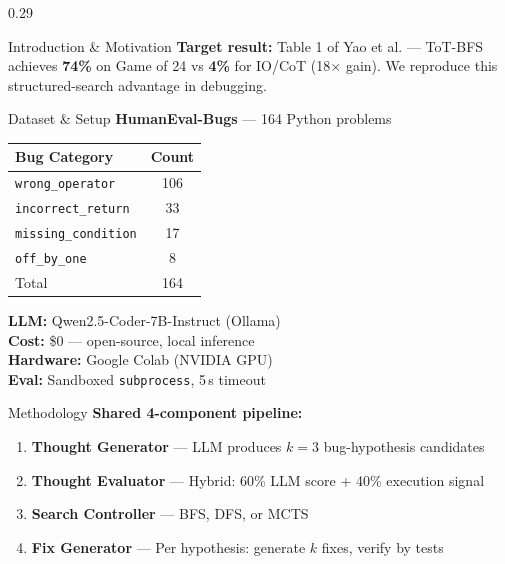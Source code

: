 \documentclass[final]{beamer}
\begin{document}
\begin{frame}[t]{}
\begin{columns}[t,totalwidth=\textwidth]
\begin{column}{0.29\textwidth}
\begin{block}{Introduction \& Motivation}
\vspace{0.4cm}
\textbf{Target result:} Table 1 of Yao et al. — ToT-BFS achieves \textbf{74\%} on Game of 24 vs \textbf{4\%} for IO/CoT (18$\times$ gain). We reproduce this structured-search advantage in debugging.
\end{block}

\vspace{0.5cm}

\begin{block}{Dataset \& Setup}
\textbf{HumanEval-Bugs} — 164 Python problems

\vspace{0.35cm}
\begin{tabular}{@{} l c @{}}
\toprule
\textbf{Bug Category} & \textbf{Count} \\
\midrule
\texttt{wrong\_operator}    & 106 \\
\texttt{incorrect\_return}  & 33  \\
\texttt{missing\_condition} & 17  \\
\texttt{off\_by\_one}       & 8   \\
\midrule
Total                        & 164 \\
\bottomrule
\end{tabular}

\vspace{0.35cm}
\textbf{LLM:} Qwen2.5-Coder-7B-Instruct (Ollama)\\
\textbf{Cost:} \$0 — open-source, local inference\\
\textbf{Hardware:} Google Colab (NVIDIA GPU)\\
\textbf{Eval:} Sandboxed \texttt{subprocess}, 5\,s timeout
\end{block}

\vspace{0.5cm}

\begin{block}{Methodology}
\textbf{Shared 4-component pipeline:}
\begin{enumerate}
\setlength{\itemsep}{2pt}
  \item \textbf{Thought Generator} — LLM produces $k{=}3$ bug-hypothesis candidates
  \item \textbf{Thought Evaluator} — Hybrid: 60\% LLM score + 40\% execution signal
  \item \textbf{Search Controller} — BFS, DFS, or MCTS
  \item \textbf{Fix Generator} — Per hypothesis: generate $k$ fixes, verify by tests
\end{enumerate}


\end{block}
\end{column}
\end{columns}
\end{frame}
\end{document}
